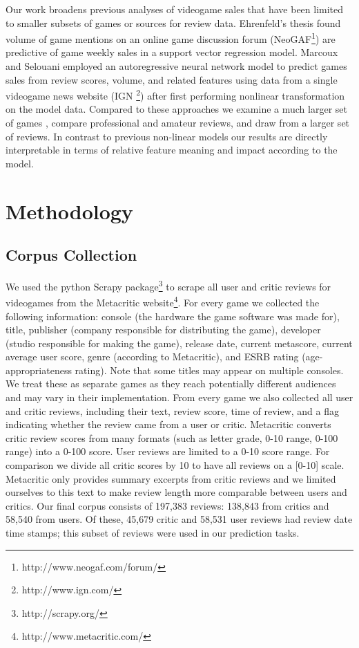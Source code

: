 \documentclass[letterpaper]{article}
\begin{document}

Our work broadens previous analyses of videogame sales that have been limited to smaller subsets of games or sources for review data. Ehrenfeld's thesis found volume of game mentions on an online game discussion forum (NeoGAF\footnote{http://www.neogaf.com/forum/}) are predictive of game weekly sales in a support vector regression model. Marcoux and Selouani employed an autoregressive neural network model to predict games sales from review scores, volume, and related features using data from a single videogame news website (IGN \footnote{http://www.ign.com/}) after first performing nonlinear transformation on the model data. Compared to these approaches we examine a much larger set of games , compare professional and amateur reviews, and draw from a larger set of reviews. In contrast to previous non-linear models our results are directly interpretable in terms of relative feature meaning and impact according to the model.


\section{Methodology}

\subsection{Corpus Collection}
We used the python Scrapy package\footnote{http://scrapy.org/} to scrape all user and critic reviews for videogames from the Metacritic website\footnote{http://www.metacritic.com/}. For every game we collected the following information: console (the hardware the game software was made for), title, publisher (company responsible for distributing the game), developer (studio responsible for making the game), release date, current metascore, current average user score, genre (according to Metacritic), and ESRB rating (age-appropriateness rating). Note that some titles may appear on multiple consoles. We treat these as separate games as they reach potentially different audiences and may vary in their implementation. From every game we also collected all user and critic reviews, including their text, review score, time of review, and a flag indicating whether the review came from a user or critic. Metacritic converts critic review scores from many formats (such as letter grade, 0-10 range, 0-100 range) into a 0-100 score. User reviews are limited to a 0-10 score range. For comparison we divide all critic scores by 10 to have all reviews on a [0-10] scale. Metacritic only provides summary excerpts from critic reviews and we limited ourselves to this text to make review length more comparable between users and critics. Our final corpus consists of 197,383 reviews: 138,843 from critics and 58,540 from users. Of these, 45,679 critic and 58,531 user reviews had review date time stamps; this subset of reviews were used in our prediction tasks.
\end{document}
